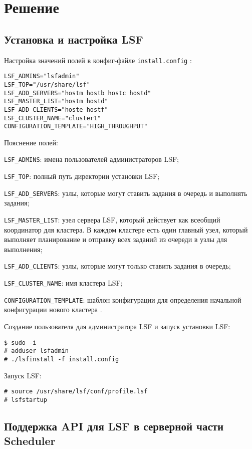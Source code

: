 \section{Решение} 


\subsection{Установка и настройка LSF}

Настройка значений полей в конфиг-файле \lstinline{install.config} \cite{install_plan}:
\begin{lstlisting}
LSF_ADMINS="lsfadmin"
LSF_TOP="/usr/share/lsf"
LSF_ADD_SERVERS="hostm hostb hostc hostd"
LSF_MASTER_LIST="hostm hostd"
LSF_ADD_CLIENTS="hoste hostf"
LSF_CLUSTER_NAME="cluster1"
CONFIGURATION_TEMPLATE="HIGH_THROUGHPUT"    
\end{lstlisting}

Пояснение полей:

\lstinline{LSF_ADMINS}: имена пользователей администраторов LSF;

\lstinline{LSF_TOP}: полный путь директории установки LSF;

\lstinline{LSF_ADD_SERVERS}: узлы, которые могут ставить задания в очередь и выполнять задания;

\lstinline{LSF_MASTER_LIST}: узел сервера LSF, который действует как всеобщий координатор для кластера. В каждом кластере есть один главный узел, который выполняет планирование и отправку всех заданий из очереди в узлы для выполнения;

\lstinline{LSF_ADD_CLIENTS}: узлы, которые могут только ставить задания в очередь;

\lstinline{LSF_CLUSTER_NAME}: имя кластера LSF;

\lstinline{CONFIGURATION_TEMPLATE}: шаблон конфигурации для определения начальной конфигурации нового кластера \cite{lsf_overview,host_types_models}.


Создание пользователя для администратора LSF и запуск установки LSF: 
\begin{lstlisting}
$ sudo -i
# adduser lsfadmin
# ./lsfinstall -f install.config
\end{lstlisting}

Запуск LSF:
\begin{lstlisting}
# source /usr/share/lsf/conf/profile.lsf
# lsfstartup
\end{lstlisting}


\subsection{Поддержка API для LSF в серверной части Scheduler}

